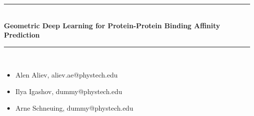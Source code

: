 \begin{titlepage}
\thispagestyle{empty}
\newcommand{\HRule}{\rule{\linewidth}{0.5mm}}
\hspace{1cm}
\center

\newcommand{\coursename}{Сложность вычислений 3 к. 5 с.}



\HRule\\[1cm]
{ \Large \bfseries Geometric Deep Learning for Protein-Protein Binding Affinity
Prediction}\\[1cm]
\HRule \\[2.4cm]
\MSonehalfspacing

\begin{minipage}[t]{0.8\textwidth}
	\begin{itemize}
	\item Alen Aliev, aliev.ae@phystech.edu
	\item Ilya Igashov, dummy@phystech.edu
	\item Arne Schneuing, dummy@phystech.edu
	\end{itemize}
\end{minipage}

\vspace{2.9cm}
\end{titlepage}
\restoregeometry


